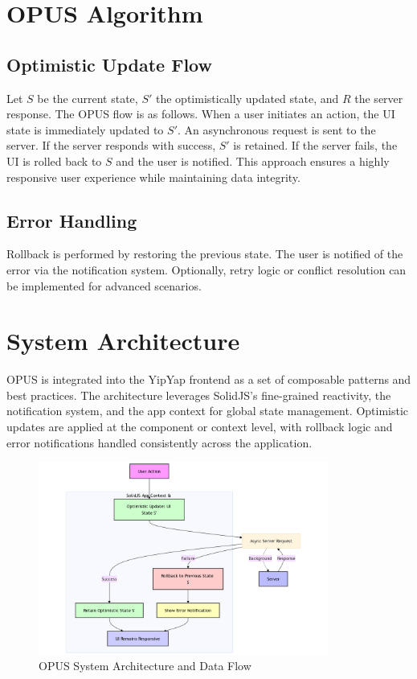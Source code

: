 \documentclass[10pt]{article}
\begin{document}
\section{OPUS Algorithm}
\subsection{Optimistic Update Flow}
Let $S$ be the current state, $S'$ the optimistically updated state, and $R$ the server response. The OPUS flow is as follows. When a user initiates an action, the UI state is immediately updated to $S'$. An asynchronous request is sent to the server. If the server responds with success, $S'$ is retained. If the server fails, the UI is rolled back to $S$ and the user is notified. This approach ensures a highly responsive user experience while maintaining data integrity.

\subsection{Error Handling}
Rollback is performed by restoring the previous state. The user is notified of the error via the notification system. Optionally, retry logic or conflict resolution can be implemented for advanced scenarios.

\section{System Architecture}
OPUS is integrated into the YipYap frontend as a set of composable patterns and best practices. The architecture leverages SolidJS's fine-grained reactivity, the notification system, and the app context for global state management. Optimistic updates are applied at the component or context level, with rollback logic and error notifications handled consistently across the application.

\begin{figure}[H]
\centering
\includegraphics[width=0.85\textwidth]{opus_diagram.png}
\caption{OPUS System Architecture and Data Flow}
\label{fig:opus_architecture}
\end{figure}
\end{document}
